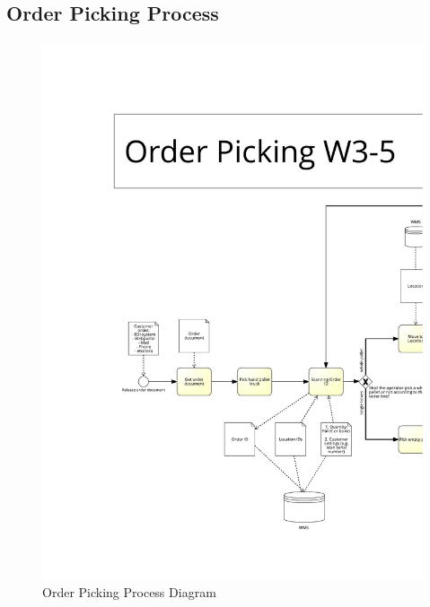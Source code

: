 \begin{appendices}
\addtocounter{chapter}{1}
\renewcommand{\sectionmark}[1]{%
\markboth{\textbf{#1}}{}}

\section{Order Picking Process}
\vspace*{-2cm}
\begin{figure}[H]
	\includegraphics[width=\textwidth, page=1]{images/OrderPickingW3-5}
	\caption{Order Picking Process Diagram \citep{image:logwearOrderPicking}}
	\label{fig:orderPickingProcessDiagram}
\end{figure}
\begin{figure}\ContinuedFloat

\end{figure}
\end{appendices}

